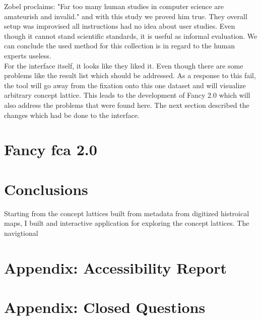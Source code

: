 \documentclass[11pt]{report}
\begin{document}
{{ Zobel \cite{Zobel2004} proclaims: "Far too many human studies in computer science are amateurish and invalid." and with this study we proved him true. They overall setup was improvised all instructions had no idea about user studies. Even though it cannot stand scientific standards, it is useful as informal evaluation. We can conclude the used method for this collection is in regard to the human experts useless. \\
 
 For the interface itself, it looks like they liked it. Even though there are some problems like the result list which should be addressed. As a response to this fail, the tool will go away from the fixation onto this one dataset and will visualize arbitrary concept lattice. This leads to the development of Fancy 2.0 which will also address the problems that were found here. The next section described the changes which had be done to the interface.
 
\chapter{Fancy \acrshort{fca} 2.0}
\label{Fancy 2.0}

\blindtext

\chapter{Conclusions}
\label{Conclusions}

Starting from the concept lattices built from metadata from digitized histroical maps, I built and interactive application for exploring the concept lattices. The navigtional 

\newpage



\listoffigures
\listoftables 


\newpage
\appendix
\chapter{Appendix: Accessibility Report}
\label{app:access}



\chapter{Appendix: Closed Questions}
\label{app:closed}



}}
\end{document}

